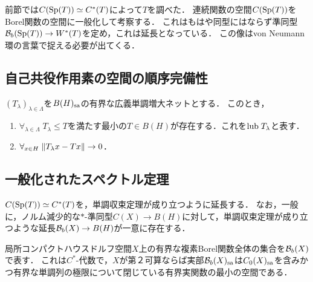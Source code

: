 \documentclass[uplatex,dvipdfmx]{jsreport}
\begin{document}
\begin{tcolorbox}[colframe=ForestGreen, colback=ForestGreen!10!white,breakable,colbacktitle=ForestGreen!40!white,coltitle=black,fonttitle=\bfseries\sffamily,
title=]
    前節では$C(\mathrm{Sp}(T))\simeq C^*(T)$によって$T$を調べた．
    連続関数の空間$C(\mathrm{Sp}(T))$をBorel関数の空間に一般化して考察する．
    これはもはや同型にはならず準同型$\mathcal{B}_b(\mathrm{Sp}(T))\to W^*(T)$を定め，これは延長となっている．
    この像はvon Neumann環の言葉で捉える必要が出てくる．
\end{tcolorbox}

\subsection{自己共役作用素の空間の順序完備性}

\begin{proposition}
    $(T_\lambda)_{\lambda\in\Lambda}$を$B(H)_{\mathrm{sa}}$の有界な広義単調増大ネットとする．
    このとき，
    \begin{enumerate}
        \item $\forall_{\lambda\in\Lambda}\;T_\lambda\le T$を満たす最小の$T\in B(H)$が存在する．これを$\mathrm{lub}\; T_\lambda$と表す．
        \item $\forall_{x\in H}\;\|T_\lambda x-Tx\|\to0$．
    \end{enumerate}
\end{proposition}

\subsection{一般化されたスペクトル定理}

\begin{tcolorbox}[colframe=ForestGreen, colback=ForestGreen!10!white,breakable,colbacktitle=ForestGreen!40!white,coltitle=black,fonttitle=\bfseries\sffamily,
title=]
    $C(\mathrm{Sp}(T))\simeq C^*(T)$を，単調収束定理が成り立つように延長する．
    なお，一般に，ノルム減少的な$*$-準同型$C(X)\to B(H)$に対して，単調収束定理が成り立つような延長$\mathcal{B}_b(X)\to B(H)$が一意に存在する．
\end{tcolorbox}

\begin{notation}[有界Borel関数の空間]
    局所コンパクトハウスドルフ空間$X$上の有界な複素Borel関数全体の集合を$\mathcal{B}_b(X)$で表す．
    これは$C^*$-代数で，$X$が第２可算ならば実部$\mathcal{B}_b(X)_{\mathrm{sa}}$は$C_0(X)_{\mathrm{sa}}$を含みかつ有界な単調列の極限について閉じている有界実関数の最小の空間である．
\end{notation}
\end{document}
